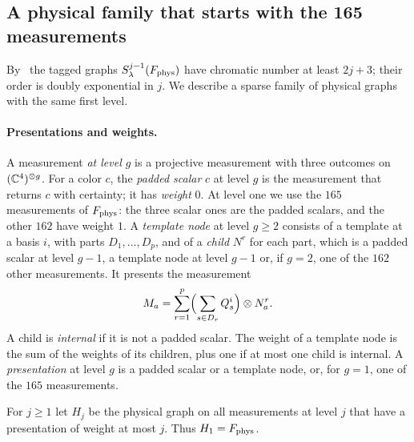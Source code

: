 \subsection{A physical family that starts with the 165 measurements}\label{sec:Hj}

By~\cite[Corollary~6.3]{Z} the tagged graphs $S^{j-1}_\lambda(F_{\rm phys})$ have chromatic number at least $2j+3$; their order is doubly exponential in $j$. We describe a sparse family of physical graphs with the same first level.

\paragraph{Presentations and weights.}
A measurement \emph{at level $g$} is a projective measurement with three outcomes on $(\mathbb C^4)^{\otimes g}$. For a color $c$, the \emph{padded scalar} $c$ at level $g$ is the measurement that returns $c$ with certainty; it has \emph{weight} $0$. At level one we use the $165$ measurements of $F_{\rm phys}$: the three scalar ones are the padded scalars, and the other $162$ have weight $1$. A \emph{template node} at level $g\ge2$ consists of a template at a basis $i$, with parts $D_1,\ldots,D_p$, and of a \emph{child} $N^r$ for each part, which is a padded scalar at level $g-1$, a template node at level $g-1$ or, if $g=2$, one of the $162$ other measurements. It presents the measurement
\begin{equation}\label{eq:node}
 M_a=\sum_{r=1}^p\Bigl(\sum_{s\in D_r}Q^i_s\Bigr)\otimes N^r_a .
\end{equation}
A child is \emph{internal} if it is not a padded scalar. The weight of a template node is the sum of the weights of its children, plus one if at most one child is internal. A \emph{presentation} at level $g$ is a padded scalar or a template node, or, for $g=1$, one of the $165$ measurements.

For $j\ge1$ let $H_j$ be the physical graph on all measurements at level $j$ that have a presentation of weight at most $j$. Thus $H_1=F_{\rm phys}$.

